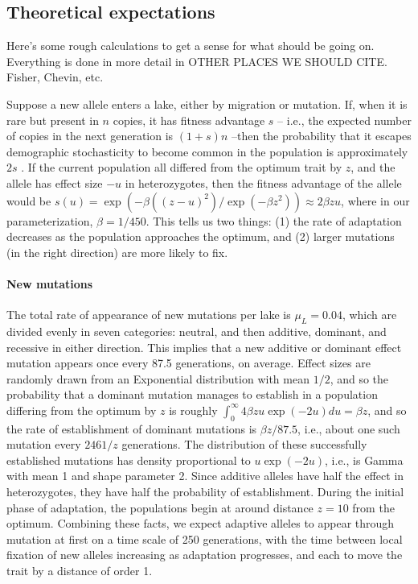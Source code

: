 \documentclass{article}
\newcommand{\plr}[1]{\todo[linecolor=blue,backgroundcolor=blue!25,bordercolor=blue]{#1}}
\begin{document}


\subsection*{Theoretical expectations}
\plr{does this go first or second?}

Here's some rough calculations to get a sense for what should be going on. Everything is done in more detail in OTHER PLACES WE SHOULD CITE.
Fisher, Chevin, etc.

Suppose a new allele enters a lake, either by migration or mutation. If, when it is rare but present in $n$ copies, it has fitness advantage $s$ -- i.e., the expected number of copies in the next generation is $(1+s)n$ --then the probability that it escapes demographic stochasticity to become common in the population is approximately $2s$ \citep{fisher,prob_fixation}. If the current population all differed from the optimum trait by $z$, and the allele has effect size $-u$ in heterozygotes, then the fitness advantage of the allele would be $s(u) = \exp(-\beta((z - u)^2) / \exp( - \beta z^2)) \approx 2 \beta z u$, where in our parameterization, $\beta = 1 / 450$. This tells us two things: (1) the rate of adaptation decreases as the population approaches the optimum, and (2) larger mutations (in the right direction) are more likely to fix.

\paragraph{New mutations}
The total rate of appearance of new mutations per lake is $\mu_L = 0.04$, which are divided evenly in seven categories: neutral, and then additive, dominant, and recessive in either direction. This implies that a new additive or dominant effect mutation appears once every 87.5 generations, on average. Effect sizes are randomly drawn from an Exponential distribution with mean $1/2$, and so the probability that a dominant mutation manages to establish in a population differing from the optimum by $z$ is roughly $\int_0^\infty 4 \beta z u \exp(-2u) du = \beta z$, and so the rate of establishment of dominant mutations is $\beta z / 87.5$, i.e., about one such mutation every $2461/z$ generations. The distribution of these successfully established mutations  has density proportional to $u \exp(-2u)$, i.e., is Gamma with mean 1 and shape parameter 2. Since additive alleles have half the effect in heterozygotes, they have half the probability of establishment. During the initial phase of adaptation, the populations begin at around distance $z=10$ from the optimum. Combining these facts, we expect adaptive alleles to appear through mutation at first on a time scale of 250 generations, with the time between local fixation of new alleles increasing as adaptation progresses, and each to move the trait by a distance of order 1.
\end{document}
